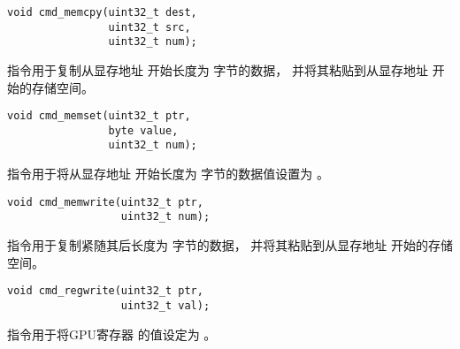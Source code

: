 

\begin{framed}
\begin{verbatim}
void cmd_memcpy(uint32_t dest,
                uint32_t src,
                uint32_t num);
\end{verbatim}
\end{framed}

 指令用于复制从显存地址  开始长度为  字节的数据，
并将其粘贴到从显存地址 开始的存储空间。


\begin{framed}
\begin{verbatim}
void cmd_memset(uint32_t ptr,
                byte value,
                uint32_t num);
\end{verbatim}
\end{framed}

 指令用于将从显存地址  开始长度为  字节的数据值设置为  。


\begin{framed}
\begin{verbatim}
void cmd_memwrite(uint32_t ptr,
                  uint32_t num);
\end{verbatim}
\end{framed}

 指令用于复制紧随其后长度为  字节的数据，
并将其粘贴到从显存地址  开始的存储空间。


\begin{framed}
\begin{verbatim}
void cmd_regwrite(uint32_t ptr,
                  uint32_t val);
\end{verbatim}
\end{framed}

 指令用于将GPU寄存器  的值设定为  。



